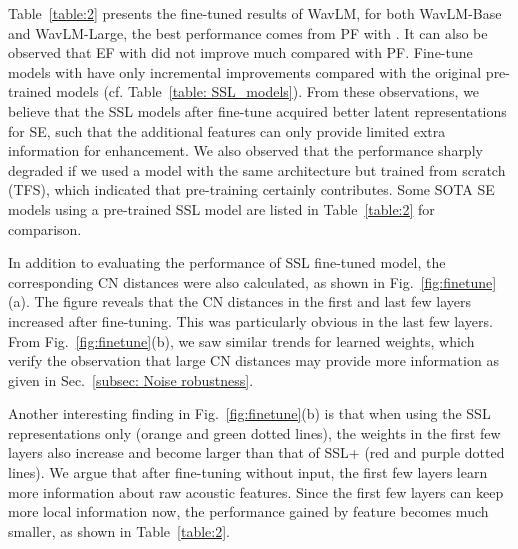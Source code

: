 \documentclass[a4paper]{article}
\begin{document}
Table~\ref{table:2} presents the fine-tuned results of WavLM, for both WavLM-Base and WavLM-Large, the best performance comes from PF with . It can also be observed that EF with  did not improve much compared with PF. Fine-tune models with  have only incremental improvements compared with the original pre-trained models (cf. Table~\ref{table: SSL_models}). From these observations, we believe that the SSL models after fine-tune acquired better latent representations for SE, such that the additional  features can only provide limited extra information for enhancement. We also observed that the performance  sharply degraded if we used a model with the same architecture but trained from scratch (TFS), which indicated that pre-training certainly contributes. Some SOTA SE models using a pre-trained SSL model are listed in Table~\ref{table:2} for comparison. 

In addition to evaluating the performance of SSL fine-tuned model, the corresponding CN distances were also calculated, as shown in Fig.~\ref{fig:finetune}(a). The figure reveals that the CN distances in the first and last few layers increased after fine-tuning. This was particularly obvious in the last few layers. From Fig.~\ref{fig:finetune}(b), we saw similar trends for learned weights, which verify the observation that large CN distances may provide more information as given in Sec.~\ref{subsec: Noise robustness}. 

Another interesting finding in Fig.~\ref{fig:finetune}(b) is that when using the SSL representations only (orange and green dotted lines), the weights in the first few layers also increase and become larger than that of SSL+ (red and purple dotted lines). We argue that after fine-tuning without  input, the first few layers learn more information about raw acoustic features. Since the first few layers can keep more local information now, the performance gained by  feature becomes much smaller, as shown in Table~\ref{table:2}. 
\end{document}

